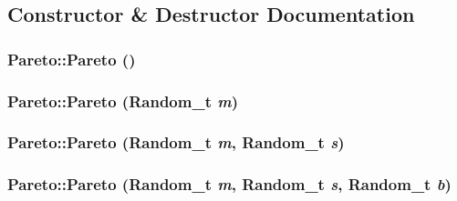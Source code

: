\subsection{Constructor \& Destructor Documentation}
\hypertarget{classPareto_a40fac27c6c9a7ba5ef782b4dda855e0}{
\subsubsection[{Pareto}]{\setlength{\rightskip}{0pt plus 5cm}Pareto::Pareto ()}}
\label{classPareto_a40fac27c6c9a7ba5ef782b4dda855e0}


\hypertarget{classPareto_5e162f7df6835da966ae4f59ec29c39d}{
\subsubsection[{Pareto}]{\setlength{\rightskip}{0pt plus 5cm}Pareto::Pareto ({\bf Random\_\-t} {\em m})}}
\label{classPareto_5e162f7df6835da966ae4f59ec29c39d}


\hypertarget{classPareto_efffb99c24a2e76a195a95b714d81d4d}{
\subsubsection[{Pareto}]{\setlength{\rightskip}{0pt plus 5cm}Pareto::Pareto ({\bf Random\_\-t} {\em m}, \/  {\bf Random\_\-t} {\em s})}}
\label{classPareto_efffb99c24a2e76a195a95b714d81d4d}


\hypertarget{classPareto_0c0abd54c6ca85f9f74c217a629dd612}{
\subsubsection[{Pareto}]{\setlength{\rightskip}{0pt plus 5cm}Pareto::Pareto ({\bf Random\_\-t} {\em m}, \/  {\bf Random\_\-t} {\em s}, \/  {\bf Random\_\-t} {\em b})}}
\label{classPareto_0c0abd54c6ca85f9f74c217a629dd612}


